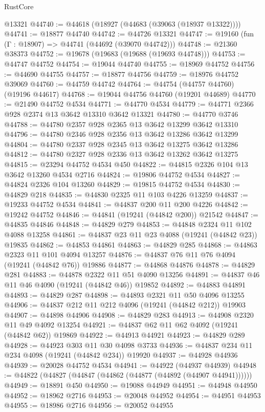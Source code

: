\begin{lexlean}{RustCore}
\begin{coremodule}
    @13321
@44740 := @44618 (@18927 (@44683 (@39063 (@18937 @13322))))
@44741 := @18877 @44740
@44742 := @44726 @13321
@44747 := @19160 (fun (Γ : @18907) => @44741 (@44692 (@39070 @44742)))
@44748 := @21360 @38373
@44752 := @19678 (@19683 (@19688 (@19693 @44748)))
@44753 := @44747 @44752
@44754 := @19044 @44740
@44755 := @18969 @44752
@44756 := @44690 @44755
@44757 := @18877 @44756
@44759 := @18976 @44752 @39069
@44760 := @44759 @44742
@44764 := @44754 (@44757 @44760) (@19196 @44617)
@44768 := @19044 @44756 @44760 (@19201 @44689)
@44770 := @21490 @44752 @4534
@44771 := @44770 @4534
@44779 := @44771 @2366 @928 @2374 @13 @3642 @13310 @3642 @13321
@44780 := @44770 @3746
@44788 := @44780 @2357 @928 @2365 @13 @3642 @13299 @3642 @13310
@44796 := @44780 @2346 @928 @2356 @13 @3642 @13286 @3642 @13299
@44804 := @44780 @2337 @928 @2345 @13 @3642 @13275 @3642 @13286
@44812 := @44780 @2327 @928 @2336 @13 @3642 @13262 @3642 @13275
@44815 := @23294 @44752 @4534 @450
@44822 := @44815 @2326 @104 @13 @3642 @13260 @4534 @2716
@44824 := @19806 @44752 @4534
@44827 := @44824 @2326 @104 @13260
@44829 := @19815 @44752 @4534
@44830 := @44829 @218
@44835 := @44830 @2325 @11 @103 @4226 @13259
@44837 := @19233 @44752 @4534
@44841 := @44837 @200 @11 @200 @4226
@44842 := @19242 @44752
@44846 := @44841 (@19241 (@44842 @200)) @21542
@44847 := @44835 @44846
@44848 := @44829 @279
@44853 := @44848 @2324 @11 @102 @4088 @13258
@44861 := @44837 @23 @11 @23 @4088 (@19241 (@44842 @23)) @19835
@44862 := @44853 @44861
@44863 := @44829 @285
@44868 := @44863 @2323 @11 @101 @4094 @13257
@44876 := @44837 @76 @11 @76 @4094 (@19241 (@44842 @76)) @19886
@44877 := @44868 @44876
@44878 := @44829 @281
@44883 := @44878 @2322 @11 @51 @4090 @13256
@44891 := @44837 @46 @11 @46 @4090 (@19241 (@44842 @46)) @19852
@44892 := @44883 @44891
@44893 := @44829 @287
@44898 := @44893 @2321 @11 @50 @4096 @13255
@44906 := @44837 @212 @11 @212 @4096 (@19241 (@44842 @212)) @19903
@44907 := @44898 @44906
@44908 := @44829 @283
@44913 := @44908 @2320 @11 @49 @4092 @13254
@44921 := @44837 @62 @11 @62 @4092 (@19241 (@44842 @62)) @19869
@44922 := @44913 @44921
@44923 := @44829 @289
@44928 := @44923 @303 @11 @30 @4098 @3733
@44936 := @44837 @234 @11 @234 @4098 (@19241 (@44842 @234)) @19920
@44937 := @44928 @44936
@44939 := @20028 @44752 @4534
@44941 := @44922 (@44937 @44939)
@44948 := @44822 (@44827 (@44847 (@44862 (@44877 (@44892 (@44907 @44941))))))
@44949 := @18891 @450
@44950 := @19088 @44949
@44951 := @44948 @44950
@44952 := @18962 @2716
@44953 := @20048 @44952
@44954 := @44951 @44953
@44955 := @18986 @2716
@44956 := @20052 @44955

\end{coremodule}
\end{lexlean}
